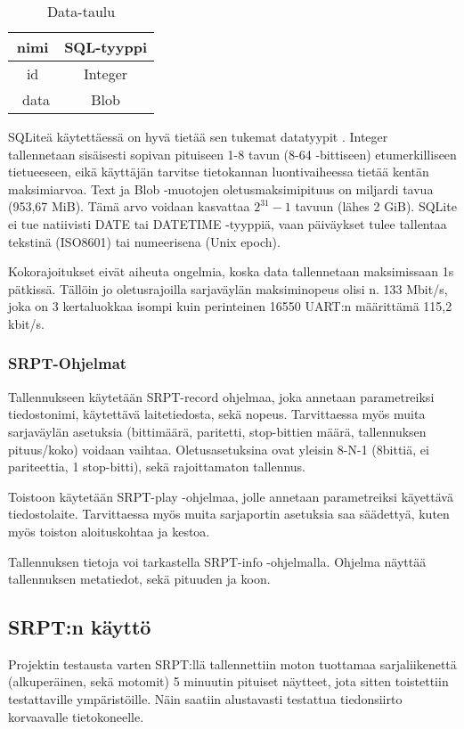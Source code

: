 \vspace{10mm}

\begin{table}[h]
\caption{Data-taulu}
\begin{tabular}{ c|c }
nimi & SQL-tyyppi \\\toprule
id & Integer \\\
data & Blob \\\bottomrule
\end{tabular}
\end{table}

SQLiteä käytettäessä on hyvä tietää sen tukemat datatyypit \cite{sqlite:datatype3}. Integer tallennetaan sisäisesti sopivan pituiseen 1-8 tavun (8-64 -bittiseen) etumerkilliseen tietueeseen, eikä käyttäjän tarvitse tietokannan luontivaiheessa tietää kentän maksimiarvoa. Text ja Blob -muotojen oletusmaksimipituus on miljardi tavua (953,67 MiB). Tämä arvo voidaan kasvattaa $2^{31}-1$ tavuun (lähes 2 GiB). SQLite ei tue natiivisti DATE tai DATETIME -tyyppiä, vaan päiväykset tulee tallentaa tekstinä (ISO8601) tai numeerisena (Unix epoch).

Kokorajoitukset eivät aiheuta ongelmia, koska data tallennetaan maksimissaan 1s pätkissä. Tällöin jo oletusrajoilla sarjaväylän maksiminopeus olisi n. 133 Mbit/s, joka on 3 kertaluokkaa isompi kuin perinteinen 16550 UART:n määrittämä 115,2 kbit/s.\cite{sqlite:limits}

\subsubsection{SRPT-Ohjelmat}
Tallennukseen käytetään SRPT-record ohjelmaa, joka annetaan parametreiksi tiedostonimi, käytettävä laitetiedosta, sekä nopeus. Tarvittaessa myös muita sarjaväylän asetuksia (bittimäärä, paritetti, stop-bittien määrä, tallennuksen pituus/koko) voidaan vaihtaa. Oletusasetuksina ovat yleisin 8-N-1 (8bittiä, ei pariteettia, 1 stop-bitti), sekä rajoittamaton tallennus.

Toistoon käytetään SRPT-play -ohjelmaa, jolle annetaan parametreiksi käyettävä tiedostolaite. Tarvittaessa myös muita sarjaportin asetuksia saa säädettyä, kuten myös toiston aloituskohtaa ja kestoa.

Tallennuksen tietoja voi tarkastella SRPT-info -ohjelmalla. Ohjelma näyttää tallennuksen metatiedot, sekä pituuden ja koon.

\subsection{SRPT:n käyttö}
Projektin testausta varten SRPT:llä tallennettiin moton tuottamaa sarjaliikenettä (alkuperäinen, sekä motomit) 5 minuutin pituiset näytteet, jota sitten toistettiin testattaville ympäristöille. Näin saatiin alustavasti testattua tiedonsiirto korvaavalle tietokoneelle.

